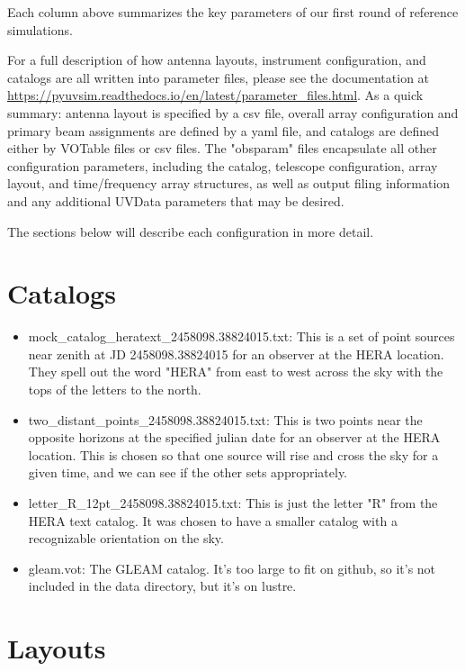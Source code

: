 \documentclass{article}
\begin{document}
Each column above summarizes the key parameters of our first round of reference simulations. 

For a full description of how antenna layouts, instrument configuration, and catalogs are all written into parameter files, please see the documentation at \url{https://pyuvsim.readthedocs.io/en/latest/parameter_files.html}. As a quick summary: antenna layout is specified by a csv file, overall array configuration and primary beam assignments are defined by a yaml file, and catalogs are defined either by VOTable files or csv files. The "obsparam" files encapsulate all other configuration parameters, including the catalog, telescope configuration, array layout, and time/frequency array structures, as well as output filing information and any additional UVData parameters that may be desired.

The sections below will describe each configuration in more detail.

 
\section*{Catalogs}

\begin{itemize}
\item[] mock\_catalog\_heratext\_2458098.38824015.txt:
     This is a set of point sources near zenith at JD 2458098.38824015 for an observer at the HERA location. They spell out the word "HERA" from east to west across the sky with the tops of the letters to the north.

\item[] two\_distant\_points\_2458098.38824015.txt:
     This is two points near the opposite horizons at the specified julian date for an observer at the HERA location. This is chosen so that one source will rise and cross the sky for a given time, and we can see if the other sets appropriately.

\item[] letter\_R\_12pt\_2458098.38824015.txt:
     This is just the letter "R" from the HERA text catalog. It was chosen to have a smaller catalog with a recognizable orientation on the sky.

\item[] gleam.vot:
     The GLEAM catalog. It's too large to fit on github, so it's not included in the data directory, but it's on lustre.

\end{itemize}


\section*{Layouts}
\end{document}
